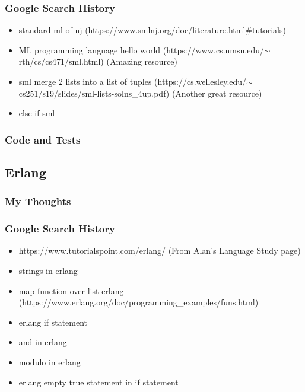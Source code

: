 \documentclass[letterpaper, 10pt, DIV=13]{scrartcl}
\numberwithin{equation}{section}
\numberwithin{figure}{section}
\numberwithin{table}{section}
\begin{document}
\subsubsection{Google Search History}
\begin{itemize}
    \item standard ml of nj (https://www.smlnj.org/doc/literature.html\#tutorials)
    \item ML programming language hello world (https://www.cs.nmsu.edu/$\sim$rth/cs/cs471/sml.html) (Amazing resource)
    \item sml merge 2 lists into a list of tuples (https://cs.wellesley.edu/$\sim$cs251/s19/slides/sml-lists-solns\_4up.pdf) (Another great resource)
    \item else if sml
\end{itemize}

\subsubsection{Code and Tests}



\subsection{Erlang}
\subsubsection{My Thoughts}

\subsubsection{Google Search History}
\begin{itemize}
    \item https://www.tutorialspoint.com/erlang/ (From Alan's Language Study page)
    \item strings in erlang
    \item map function over list erlang (https://www.erlang.org/doc/programming\_examples/funs.html)
    \item erlang if statement
    \item and in erlang
    \item modulo in erlang
    \item erlang empty true statement in if statement
\end{itemize}
\end{document}
